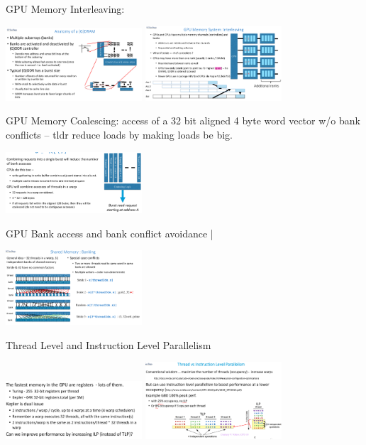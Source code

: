 \documentclass[letter,8pt,landscape]{article}
\begin{document}
\begin{multicols}{3}
  GPU Memory Interleaving:
  \begin{center}
    \includegraphics[width=2in]{images/gdram.jpg}
    \includegraphics[width=2in]{images/interleaving.jpg}
  \end{center}

  GPU Memory Coalescing: access of a 32 bit aligned 4 byte word vector w/o bank
  conflicts -- tldr reduce loads by making loads be big.
  \begin{center}
    \includegraphics[width=2in]{images/coalescing.jpg}
  \end{center}

  GPU Bank access and bank conflict avoidance |
  \begin{center}
    \includegraphics[width=2in]{images/banks.jpg}
  \end{center}
  
  Thread Level and Instruction Level Parallelism
  \begin{center}
    \includegraphics[width=2in]{images/gpu-ilp.jpg}
    \includegraphics[width=2in]{images/gpu-tlp-ilp.jpg}
  \end{center}
  




\end{multicols}
\end{document}
